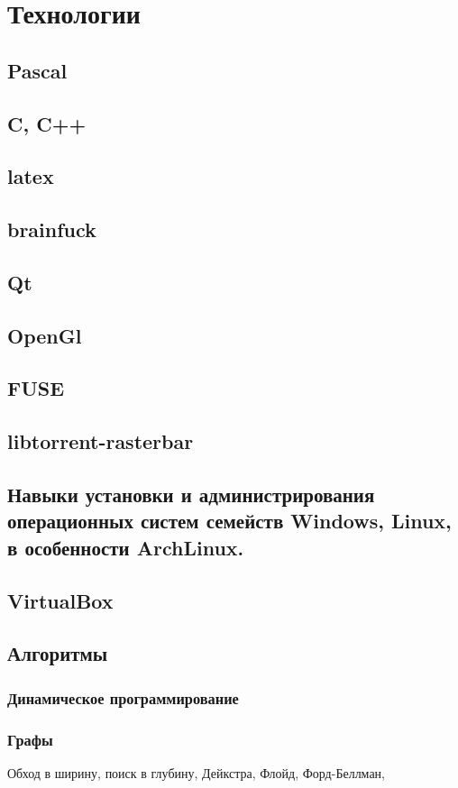 \documentclass[a4paper,10pt]{article}
\begin{document}
\section{Технологии} {
    \subsection{Pascal}{}
    \subsection{C, C++}{}
    \subsection{latex}
    \subsection{brainfuck}
    \subsection{Qt}{}{}
    \subsection{OpenGl}{}
    \subsection{FUSE}{}
    \subsection{libtorrent-rasterbar}{}
    \subsection{Навыки установки и администрирования операционных систем семейств Windows, Linux, в особенности ArchLinux.}{}
    \subsection{VirtualBox}{}
    \subsection{Алгоритмы}{
	\subsubsection{Динамическое программирование}{}
	\subsubsection{Графы}{Обход в ширину, поиск в глубину, Дейкстра, Флойд, Форд-Беллман,
}}}
\end{document}
